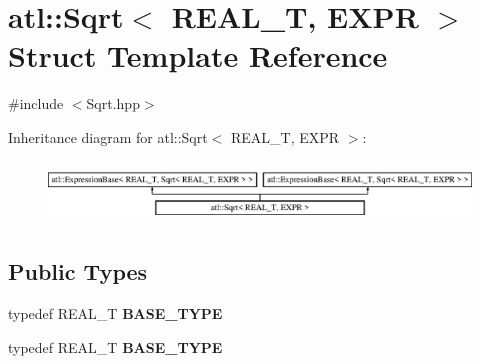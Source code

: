 \hypertarget{structatl_1_1_sqrt}{\section{atl\+:\+:Sqrt$<$ R\+E\+A\+L\+\_\+\+T, E\+X\+P\+R $>$ Struct Template Reference}
\label{structatl_1_1_sqrt}
}


{\ttfamily \#include $<$Sqrt.\+hpp$>$}

Inheritance diagram for atl\+:\+:Sqrt$<$ R\+E\+A\+L\+\_\+\+T, E\+X\+P\+R $>$\+:\begin{figure}[H]
\begin{center}
\leavevmode
\includegraphics[height=1.637427cm]{structatl_1_1_sqrt}
\end{center}
\end{figure}
\subsection*{Public Types}
\begin{DoxyCompactItemize}
\item 
\hypertarget{structatl_1_1_sqrt_a5f665ddd001904f2bf54c0b30359ee17}{typedef R\+E\+A\+L\+\_\+\+T {\bfseries B\+A\+S\+E\+\_\+\+T\+Y\+P\+E}}\label{structatl_1_1_sqrt_a5f665ddd001904f2bf54c0b30359ee17}

\item 
\hypertarget{structatl_1_1_sqrt_a5f665ddd001904f2bf54c0b30359ee17}{typedef R\+E\+A\+L\+\_\+\+T {\bfseries B\+A\+S\+E\+\_\+\+T\+Y\+P\+E}}\label{structatl_1_1_sqrt_a5f665ddd001904f2bf54c0b30359ee17}

\end{DoxyCompactItemize}
